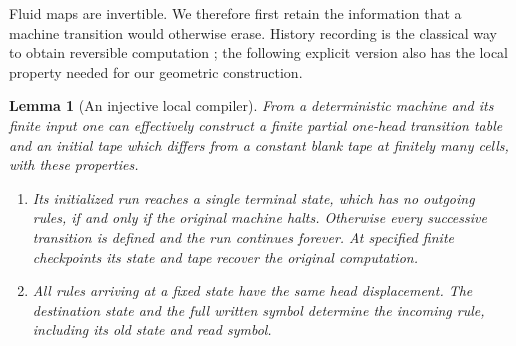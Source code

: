 \documentclass[11pt]{article}
\newtheorem{lemma}[theorem]{Lemma}
\theoremstyle{remark}\newtheorem{remark}[theorem]{Remark}
\begin{document}
Fluid maps are invertible.  We therefore first retain the information
that a machine transition would otherwise erase.  History recording
is the classical way to obtain reversible computation
\cite[Eqs.~(9)--(11)]{Bennett1973}; the following explicit version also has the local
property needed for our geometric construction.

\begin{lemma}[An injective local compiler]\label{lem:compiler}
From a deterministic machine and its finite input one can effectively
construct a finite partial one-head transition table and an initial
tape which differs from a constant blank tape at finitely many cells,
with these properties.
\begin{enumerate}
\item Its initialized run reaches a single terminal state, which has
no outgoing rules, if and only if the original machine halts.  Otherwise
every successive transition is defined and the run continues forever.
At specified finite checkpoints its state and tape recover the original
computation.
\item All rules arriving at a fixed state have the same head displacement.
The destination state and the full written symbol determine the incoming
rule, including its old state and read symbol.
\end{enumerate}
\end{lemma}
\end{document}
